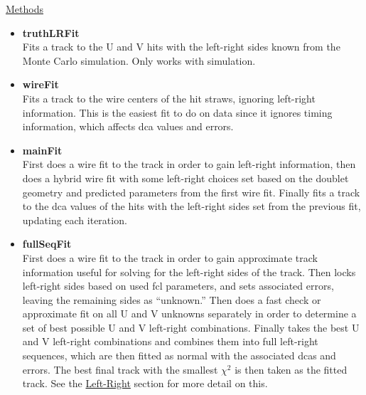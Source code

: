 \begin{enumerate}
      \underline{Methods}

        \begin{itemize}

          \item{\bf{truthLRFit}} \\
          Fits a track to the U and V hits with the left-right sides known from the Monte Carlo simulation. Only works with simulation.

          \item{\bf{wireFit}} \\
          Fits a track to the wire centers of the hit straws, ignoring left-right information. This is the easiest fit to do on data since it ignores timing information, which affects dca values and errors.

          \item{\bf{mainFit}} \\
          First does a wire fit to the track in order to gain left-right information, then does a hybrid wire fit with some left-right choices set based on the doublet geometry and predicted parameters from the first wire fit. Finally fits a track to the dca values of the hits with the left-right sides set from the previous fit, updating each iteration.

          \item{\bf{fullSeqFit}} \\
          First does a wire fit to the track in order to gain approximate track information useful for solving for the left-right sides of the track. Then locks left-right sides based on used fcl parameters, and sets associated errors, leaving the remaining sides as ``unknown.'' Then does a fast check or approximate fit on all U and V unknowns separately in order to determine a set of best possible U and V left-right combinations. Finally takes the best U and V left-right combinations and combines them into full left-right sequences, which are then fitted as normal with the associated dcas and errors. The best final track with the smallest $\chi^{2}$ is then taken as the fitted track. See the \hyperref[sec:LR]{Left-Right} section for more detail on this.


\end{itemize}
\end{enumerate}
